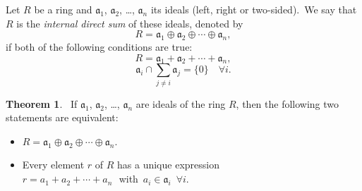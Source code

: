 \documentclass[12pt]{article}
\theoremstyle{definition}
\newtheorem*{thmplain}{Theorem}
\begin{document}
Let $R$ be a ring and $\mathfrak{a}_1$, $\mathfrak{a}_2$, \ldots, $\mathfrak{a}_n$ its ideals (left, right or two-sided). \,We say that $R$ is the {\em internal direct sum} of these ideals, denoted by
  $$R =  \mathfrak{a}_1\oplus\mathfrak{a}_2\oplus\cdots\oplus\mathfrak{a}_n,$$
if both of the following conditions are true:
$$R = \mathfrak{a}_1+\mathfrak{a}_2+\cdots+\mathfrak{a}_n,$$
$$\mathfrak{a}_i\cap\sum_{j\neq i}\mathfrak{a}_j = \{0\}\quad\forall i.$$

\begin{thmplain}
 \, If  $\mathfrak{a}_1$, $\mathfrak{a}_2$, \ldots, $\mathfrak{a}_n$ are ideals of the ring $R$, then the following two statements are equivalent:
\begin{itemize}
\item $R = \mathfrak{a}_1\oplus\mathfrak{a}_2\oplus\cdots\oplus\mathfrak{a}_n$.
\item Every element $r$ of $R$ has a unique expression\\    
$r = a_1\!+\!a_2\!+\cdots+\!a_n$ \,\,with \,$a_i\in\mathfrak{a}_i\,\,\,\forall i$.
\end{itemize}
\end{thmplain}
\end{document}
